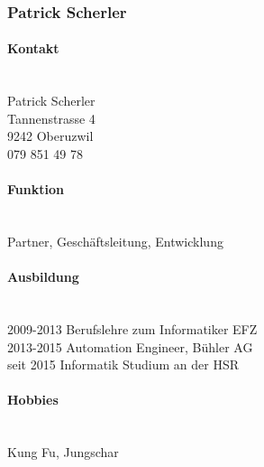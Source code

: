 \subsubsection{Patrick Scherler}
\noindent\begin{minipage}{0.7\textwidth}
	\paragraph{Kontakt} \hfill \\
	Patrick Scherler \\
	Tannenstrasse 4 \\
	9242 Oberuzwil \\
	079 851 49 78 \\
	
	\paragraph{Funktion} \hfill \\
	Partner, Geschäftsleitung, Entwicklung \\
	
	\paragraph{Ausbildung} \hfill \\
	2009-2013 \hspace{1cm} Berufslehre zum Informatiker EFZ \\
	2013-2015 \hspace{1cm} Automation Engineer, Bühler AG \\
	seit 2015 \hspace{1.25cm} Informatik Studium an der HSR \\
		
	\paragraph{Hobbies} \hfill \\
	Kung Fu, Jungschar \\
\end{minipage}
\hfill
